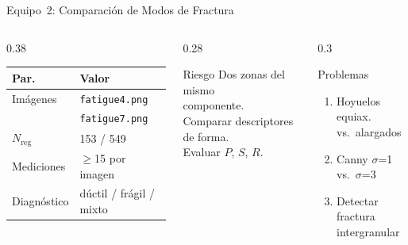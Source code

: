 \documentclass[aspectratio=169,12pt]{beamer}
\begin{document}
\begin{frame}{Equipo~2: Comparación de Modos de Fractura}
	\begin{columns}
		\begin{column}{0.38\textwidth}
			\centering\scriptsize
			\begin{tabular}{ll}
				\toprule
				\textbf{Par.}    & \textbf{Valor}          \\
				\midrule
				Imágenes         & \texttt{fatigue4.png}   \\
				                 & \texttt{fatigue7.png}   \\
				$N_\mathrm{reg}$ & 153 / 549               \\
				Mediciones       & $\geq$15 por imagen     \\
				Diagnóstico      & dúctil / frágil / mixto \\
				\bottomrule
			\end{tabular}
		\end{column}
		\begin{column}{0.28\textwidth}
			\begin{alertblock}{\scriptsize Riesgo}
				\scriptsize
				Dos zonas del mismo\\
				componente.\\
				Comparar descriptores\\
				de forma.\\
				Evaluar $P$, $S$, $R$.
			\end{alertblock}
		\end{column}
		\begin{column}{0.3\textwidth}
			\begin{exampleblock}{\scriptsize Problemas}
				\scriptsize
				\begin{enumerate}
					\item[P2.1] Hoyuelos equiax.\\
					      vs.\ alargados
					\item[P2.2] Canny $\sigma$=1\\
					      vs.\ $\sigma$=3
					\item[P2.3] Detectar fractura\\
					      intergranular
				\end{enumerate}
			\end{exampleblock}
		\end{column}
	\end{columns}
\end{frame}
\end{document}

